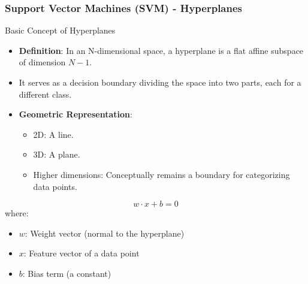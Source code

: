 \documentclass[aspectratio=169]{beamer}
\begin{document}
\begin{frame}[fragile]
    \frametitle{Support Vector Machines (SVM) - Hyperplanes}
    \begin{block}{Basic Concept of Hyperplanes}
        \begin{itemize}
            \item \textbf{Definition}: In an N-dimensional space, a hyperplane is a flat affine subspace of dimension \(N-1\).
            \item It serves as a decision boundary dividing the space into two parts, each for a different class.
            \item \textbf{Geometric Representation}:
            \begin{itemize}
                \item 2D: A line.
                \item 3D: A plane.
                \item Higher dimensions: Conceptually remains a boundary for categorizing data points.
            \end{itemize}
        \end{itemize}
    \end{block}
    
    \begin{equation}
        w \cdot x + b = 0
    \end{equation}
    where:
    \begin{itemize}
        \item \(w\): Weight vector (normal to the hyperplane)
        \item \(x\): Feature vector of a data point
        \item \(b\): Bias term (a constant)
    \end{itemize}
\end{frame}
\end{document}
